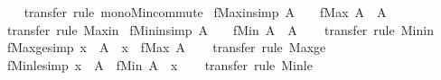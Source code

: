 \begin{isabellebody}
%
\isadelimproof
\ \ %
\endisadelimproof
%
\isatagproof
{}\isamarkupfalse%
\ transfer\ {\isacharparenleft}rule\ mono{\isacharunderscore}Min{\isacharunderscore}commute{\isacharparenright}%
\endisatagproof
{\isafoldproof}%
%
\isadelimproof
\isanewline
%
\endisadelimproof
\isanewline
{}\isamarkupfalse%
\ fMax{\isacharunderscore}in{\isacharbrackleft}simp{\isacharbrackright}{\isacharcolon}\ {\isachardoublequoteopen}A\ {\isasymnoteq}\ {\isacharbraceleft}{\isacharbar}{\isacharbar}{\isacharbraceright}\ {\isasymLongrightarrow}\ fMax\ A\ {\isacharbar}{\isasymin}{\isacharbar}\ A{\isachardoublequoteclose}\isanewline
%
\isadelimproof
\ \ %
\endisadelimproof
%
\isatagproof
{}\isamarkupfalse%
\ transfer\ {\isacharparenleft}rule\ Max{\isacharunderscore}in{\isacharparenright}%
\endisatagproof
{\isafoldproof}%
%
\isadelimproof
\isanewline
%
\endisadelimproof
\isanewline
{}\isamarkupfalse%
\ fMin{\isacharunderscore}in{\isacharbrackleft}simp{\isacharbrackright}{\isacharcolon}\ {\isachardoublequoteopen}A\ {\isasymnoteq}\ {\isacharbraceleft}{\isacharbar}{\isacharbar}{\isacharbraceright}\ {\isasymLongrightarrow}\ fMin\ A\ {\isacharbar}{\isasymin}{\isacharbar}\ A{\isachardoublequoteclose}\isanewline
%
\isadelimproof
\ \ %
\endisadelimproof
%
\isatagproof
{}\isamarkupfalse%
\ transfer\ {\isacharparenleft}rule\ Min{\isacharunderscore}in{\isacharparenright}%
\endisatagproof
{\isafoldproof}%
%
\isadelimproof
\isanewline
%
\endisadelimproof
\isanewline
{}\isamarkupfalse%
\ fMax{\isacharunderscore}ge{\isacharbrackleft}simp{\isacharbrackright}{\isacharcolon}\ {\isachardoublequoteopen}x\ {\isacharbar}{\isasymin}{\isacharbar}\ A\ {\isasymLongrightarrow}\ x\ {\isasymle}\ fMax\ A{\isachardoublequoteclose}\isanewline
%
\isadelimproof
\ \ %
\endisadelimproof
%
\isatagproof
{}\isamarkupfalse%
\ transfer\ {\isacharparenleft}rule\ Max{\isacharunderscore}ge{\isacharparenright}%
\endisatagproof
{\isafoldproof}%
%
\isadelimproof
\isanewline
%
\endisadelimproof
\isanewline
{}\isamarkupfalse%
\ fMin{\isacharunderscore}le{\isacharbrackleft}simp{\isacharbrackright}{\isacharcolon}\ {\isachardoublequoteopen}x\ {\isacharbar}{\isasymin}{\isacharbar}\ A\ {\isasymLongrightarrow}\ fMin\ A\ {\isasymle}\ x{\isachardoublequoteclose}\isanewline
%
\isadelimproof
\ \ %
\endisadelimproof
%
\isatagproof
{}\isamarkupfalse%
\ transfer\ {\isacharparenleft}rule\ Min{\isacharunderscore}le{\isacharparenright}%
\endisatagproof
{\isafoldproof}%
%
\isadelimproof
\isanewline
%
\endisadelimproof
\isanewline

\end{isabellebody}
